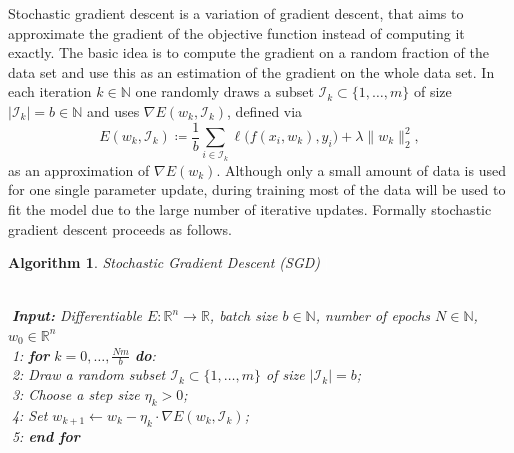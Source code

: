 \documentclass[11pt, a4paper]{article}
\newtheorem{algorithm}[theorem]{Algorithm}
\newcommand{\N}{\mathbb{N}}
\newcommand{\R}{\mathbb{R}}
\newcommand{\I}{\mathcal{I}}
\begin{document}

Stochastic gradient descent is a variation of gradient descent, that aims to approximate the gradient of the objective function instead of computing it exactly. The basic idea is to compute the gradient on a random fraction of the data set and use this as an estimation of the gradient on the whole data set. In each iteration $k \in \N$ one randomly draws a subset $\I_k \subset \{ 1, \dots, m \}$ of size $| \I_k | = b \in \N$ and uses $\nabla E(w_k,\I_k)$, defined via
\[ E(w_k,\I_k) \coloneq \frac{1}{b} \sum_{i \in \I_k}^{} \ell \big ( f(x_i,w_k),y_i \big) + \lambda \big \| w_k \big \|_2^2, \]
as an approximation of $\nabla E(w_k)$. Although only a small amount of data is used for one single parameter update, during training most of the data will be used to fit the model due to the large number of iterative updates. Formally stochastic gradient descent proceeds as follows.

\begin{algorithm} 
\caption{Stochastic Gradient Descent (SGD) \textcolor{white}{$\Big |$}} \ \\
\textcolor{white}{$\Big |$}\textbf{Input:} Differentiable $E: \R^n \to \R$, batch size $b \in \N$, number of epochs $N \in \N$, $w_0 \in \R^n$ \\
\textcolor{white}{$\Big |$}1: \textbf{for} $k=0, \dots, \frac{Nm}{b}$ \textbf{do}: \\
\textcolor{white}{$\Big |$}2: \quad Draw a random subset $\I_k \subset \{1, \dots, m \}$ of size $| \I_k | = b$; \\
\textcolor{white}{$\Big |$}3: \quad Choose a step size $\eta_k > 0$; \\
\textcolor{white}{$\Big |$}4: \quad Set $w_{k+1} \leftarrow w_k - \eta_k \cdot \nabla E(w_k,\I_k)$; \\
\textcolor{white}{$\Big |$}5: \textbf{end for}
\end{algorithm}
\end{document}
